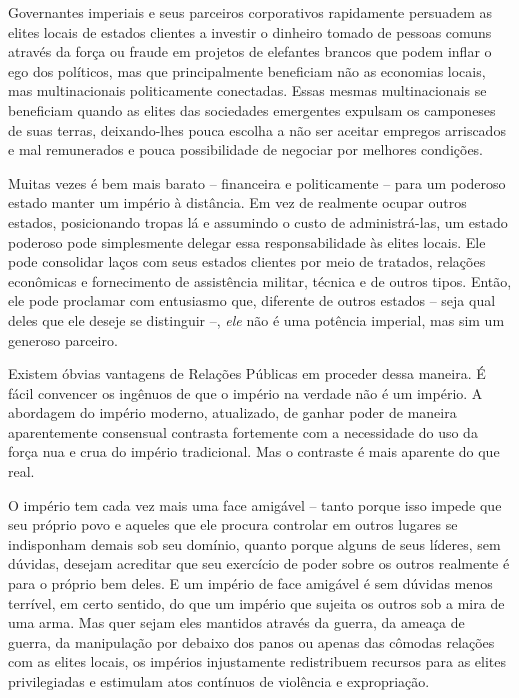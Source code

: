 Governantes imperiais e seus parceiros corporativos rapidamente persuadem as elites locais de estados clientes a investir o dinheiro tomado de pessoas comuns através da força ou fraude em projetos de elefantes brancos que podem inflar o ego dos políticos, mas que principalmente beneficiam não as economias locais, mas multinacionais politicamente conectadas. Essas mesmas multinacionais se beneficiam quando as elites das sociedades emergentes expulsam os camponeses de suas terras, deixando-lhes pouca escolha a não ser aceitar empregos arriscados e mal remunerados e pouca possibilidade de negociar por melhores condições. 

Muitas vezes é bem mais barato -- financeira e politicamente -- para um poderoso estado manter um império à distância. Em vez de realmente ocupar outros estados, posicionando tropas lá e assumindo o custo de administrá-las, um estado poderoso pode simplesmente delegar essa responsabilidade às elites locais. Ele pode consolidar laços com seus estados clientes por meio de tratados, relações econômicas e fornecimento de assistência militar, técnica e de outros tipos. Então, ele pode proclamar com entusiasmo que, diferente de outros estados -- seja qual deles que ele deseje se distinguir --, \emph{ele} não é uma potência imperial, mas sim um generoso parceiro.

Existem óbvias vantagens de Relações Públicas em proceder dessa maneira. É fácil convencer os ingênuos de que o império na verdade não é um império. A abordagem do império moderno, atualizado, de ganhar poder de maneira aparentemente consensual contrasta fortemente com a necessidade do uso da força nua e crua do império tradicional. Mas o contraste é mais aparente do que real.

O império tem cada vez mais uma face amigável -- tanto porque isso impede que seu próprio povo e aqueles que ele procura controlar em outros lugares se indisponham demais sob seu domínio, quanto porque alguns de seus líderes, sem dúvidas, desejam acreditar que seu exercício de poder sobre os outros realmente é para o próprio bem deles. E um império de face amigável é sem dúvidas menos terrível, em certo sentido, do que um império que sujeita os outros sob a mira de uma arma. Mas quer sejam eles mantidos através da guerra, da ameaça de guerra, da manipulação por debaixo dos panos ou apenas das cômodas relações com as elites locais, os impérios injustamente redistribuem recursos para as elites privilegiadas e estimulam atos contínuos de violência e expropriação.


